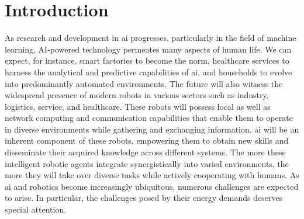 \documentclass[12pt]{article}
\begin{document}
\section*{Introduction}\label{sec:intro}
As research and development in \ac{ai} progresses, particularly in the field of machine learning, AI-powered technology permeates many aspects of human life. We can expect, for instance, smart factories to become the norm, healthcare services to harness the analytical and predictive capabilities of \ac{ai}, and households to evolve into predominantly automated environments. The future will also witness the widespread presence of modern robots in various sectors such as industry, logistics, service, and healthcare. These robots will possess local as well as network computing and communication capabilities that enable them to operate in diverse environments while gathering and exchanging information. \ac{ai} will be an inherent component of these robots, empowering them to obtain new skills and disseminate their acquired knowledge across different systems. The more these intelligent robotic agents integrate synergistically into varied environments, the more they will take over diverse tasks while actively cooperating with humans. As \ac{ai} and robotics become increasingly ubiquitous, numerous challenges are expected to arise. In particular, the challenges posed by their energy demands deserves special attention.
\end{document}
